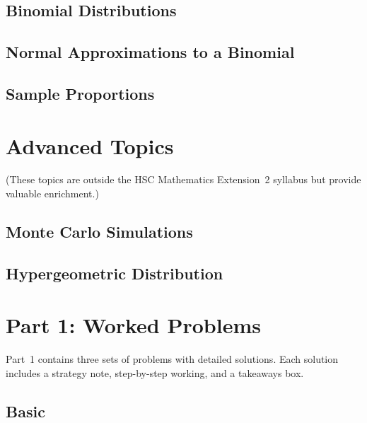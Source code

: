 \documentclass[12pt]{article}
\begin{document}
\subsection{Binomial Distributions}


\subsection{Normal Approximations to a Binomial}


\subsection{Sample Proportions}


\section{Advanced Topics}
\label{sec:advanced}
(These topics are outside the HSC Mathematics Extension~2 syllabus but provide valuable enrichment.)

\subsection{Monte Carlo Simulations}


\subsection{Hypergeometric Distribution}




\section{Part 1: Worked Problems}

Part~1 contains three sets of problems with detailed solutions. Each solution includes a strategy note, step-by-step working, and a takeaways box.

\subsection{Basic}

\end{document}
